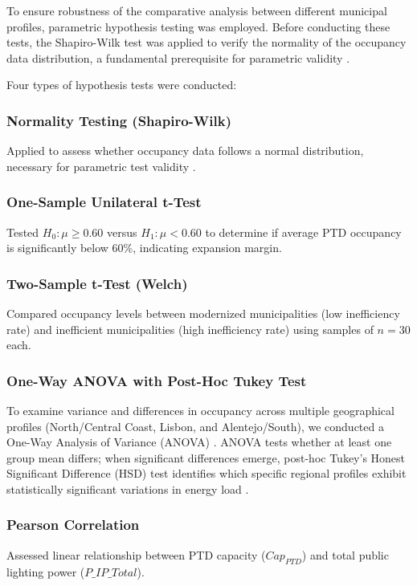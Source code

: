 \documentclass[conference]{IEEEtran}
\begin{document}
To ensure robustness of the comparative analysis between different municipal profiles, parametric hypothesis testing was employed. Before conducting these tests, the Shapiro-Wilk test was applied to verify the normality of the occupancy data distribution, a fundamental prerequisite for parametric validity \cite{Xie2015}.

Four types of hypothesis tests were conducted:

\subsubsection{Normality Testing (Shapiro-Wilk)}
Applied to assess whether occupancy data follows a normal distribution, necessary for parametric test validity \cite{Xie2015}.

\subsubsection{One-Sample Unilateral t-Test}
Tested $H_0: \mu \geq 0.60$ versus $H_1: \mu < 0.60$ to determine if average PTD occupancy is significantly below 60\%, indicating expansion margin.

\subsubsection{Two-Sample t-Test (Welch)}
Compared occupancy levels between modernized municipalities (low inefficiency rate) and inefficient municipalities (high inefficiency rate) using samples of $n=30$ each.

\subsubsection{One-Way ANOVA with Post-Hoc Tukey Test}
To examine variance and differences in occupancy across multiple geographical profiles (North/Central Coast, Lisbon, and Alentejo/South), we conducted a One-Way Analysis of Variance (ANOVA) \cite{Kodali2024}. ANOVA tests whether at least one group mean differs; when significant differences emerge, post-hoc Tukey's Honest Significant Difference (HSD) test identifies which specific regional profiles exhibit statistically significant variations in energy load \cite{Kodali2024}.

\subsubsection{Pearson Correlation}
Assessed linear relationship between PTD capacity ($Cap_{PTD}$) and total public lighting power ($P\_IP\_Total$).
\end{document}
